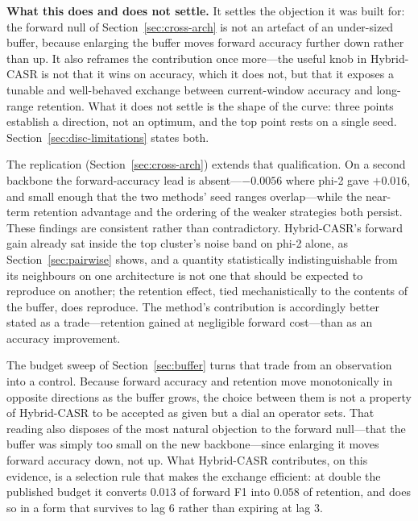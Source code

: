 \textbf{What this does and does not settle.} It settles the objection it was built for: the forward null of Section~\ref{sec:cross-arch} is not an artefact of an under-sized buffer, because enlarging the buffer moves forward accuracy further down rather than up. It also reframes the contribution once more---the useful knob in Hybrid-CASR is not that it wins on accuracy, which it does not, but that it exposes a tunable and well-behaved exchange between current-window accuracy and long-range retention. What it does not settle is the shape of the curve: three points establish a direction, not an optimum, and the top point rests on a single seed. Section~\ref{sec:disc-limitations} states both.



The replication (Section~\ref{sec:cross-arch}) extends that qualification. On a second backbone the forward-accuracy lead is absent---$-0.0056$ where phi-2 gave $+0.016$, and small enough that the two methods' seed ranges overlap---while the near-term retention advantage and the ordering of the weaker strategies both persist. These findings are consistent rather than contradictory. Hybrid-CASR's forward gain already sat inside the top cluster's noise band on phi-2 alone, as Section~\ref{sec:pairwise} shows, and a quantity statistically indistinguishable from its neighbours on one architecture is not one that should be expected to reproduce on another; the retention effect, tied mechanistically to the contents of the buffer, does reproduce. The method's contribution is accordingly better stated as a trade---retention gained at negligible forward cost---than as an accuracy improvement.

The budget sweep of Section~\ref{sec:buffer} turns that trade from an observation into a control. Because forward accuracy and retention move monotonically in opposite directions as the buffer grows, the choice between them is not a property of Hybrid-CASR to be accepted as given but a dial an operator sets. That reading also disposes of the most natural objection to the forward null---that the buffer was simply too small on the new backbone---since enlarging it moves forward accuracy down, not up. What Hybrid-CASR contributes, on this evidence, is a selection rule that makes the exchange efficient: at double the published budget it converts $0.013$ of forward F1 into $0.058$ of retention, and does so in a form that survives to lag 6 rather than expiring at lag 3.


